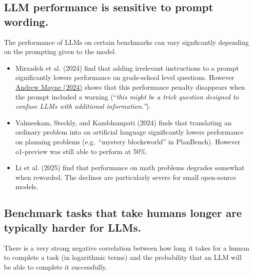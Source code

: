 \documentclass[
  letterpaper,
  DIV=11,
  numbers=noendperiod,
  oneside]{scrartcl}
\begin{document}
\subsection{LLM performance is sensitive to prompt
wording.}\label{llm-performance-is-sensitive-to-prompt-wording.}

The performance of LLMs on certain benchmarks can vary signficantly
depending on the prompting given to the model.

\begin{itemize}
\item
  Mirzadeh et al. (2024) find that adding irrelevant instructions to a
  prompt significantly lowers performance on grade-school level
  questions. However
  \href{https://andrewmayne.com/2024/10/18/can-you-dramatically-improve-results-on-the-latest-large-language-model-reasoning-benchmark-with-a-simple-prompt/}{Andrew
  Mayne (2024)} shows that this performance penalty disappears when the
  prompt included a warning (``\emph{this might be a trick question
  designed to confuse LLMs with additional information.''}).
\item
  Valmeekam, Stechly, and Kambhampati (2024) finds that translating an
  ordinary problem into an artificial language significantly lowers
  performance on planning problems (e.g.~``mystery blocksworld'' in
  PlanBench). However o1-preview was still able to perform at 50\%.
\item
  Li et al. (2025) find that performance on math problems degrades
  somewhat when reworded. The declines are particularly severe for small
  open-source models.
\end{itemize}

\subsection{Benchmark tasks that take humans longer are typically harder
for
LLMs.}\label{benchmark-tasks-that-take-humans-longer-are-typically-harder-for-llms.}

There is a very strong negative correlation between how long it takes
for a human to complete a task (in logarithmic terms) and the
probability that an LLM will be able to complete it successfully.
\end{document}
